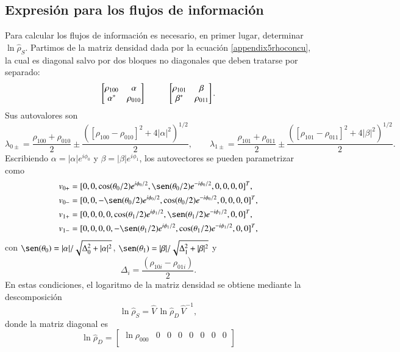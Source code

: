 \begin{appendixs}
\label{appendix5drazin}


\subsection{Expresión para los flujos de información}
Para calcular los flujos de información es necesario, en primer lugar, determinar $\ln \hat{\rho}_{S}$. Partimos de la matriz densidad dada por la ecuación \eqref{appendix5rhoconcu}, la cual es diagonal salvo por dos bloques no diagonales que deben tratarse por separado:
\[
\begin{bmatrix}
    \rho_{100} & \alpha \\
    \alpha^{*} & \rho_{010}
\end{bmatrix}
\hspace{10mm}
\begin{bmatrix}
    \rho_{101} & \beta \\
    \beta^{*} & \rho_{011}
\end{bmatrix}.
\]
Sus autovalores son
\[
\lambda_{0\pm} = \frac{ \rho_{100} +\rho_{010} }{2} \pm \frac{( [\rho_{100} - \rho_{010}]^{2} + 4|\alpha|^{2} )^{1/2} }{ 2 }, 
\qquad
\lambda_{1\pm} = \frac{ \rho_{101} +\rho_{011} }{2} \pm \frac{( [\rho_{101} - \rho_{011}]^{2} + 4|\beta|^{2} )^{1/2} }{ 2 }.
\]
Escribiendo $\alpha = |\alpha|e^{i\phi_{0}}$ y $\beta = |\beta|e^{i\phi_{1}}$, los autovectores se pueden parametrizar como
\begin{align*}
    v_{0+} &  = [0,0,\cos(\theta_{0}/2)e^{i\phi_{0}/2},\sen(\theta_{0}/2)e^{-i\phi_{0}/2},0,0,0,0]^{T}, \\
    v_{0-} &  = [0,0,-\sen(\theta_{0}/2)e^{i\phi_{0}/2},\cos(\theta_{0}/2)e^{-i\phi_{0}/2},0,0,0,0]^{T}, \\
    v_{1+} &  = [0,0,0,0,\cos(\theta_{1}/2)e^{i\phi_{1}/2},\sen(\theta_{1}/2)e^{-i\phi_{1}/2},0,0]^{T}, \\
    v_{1-} &  = [0,0,0,0,-\sen(\theta_{1}/2)e^{i\phi_{1}/2},\cos(\theta_{1}/2)e^{-i\phi_{1}/2},0,0]^{T},
\end{align*}
con $\sen(\theta_{0}) = |\alpha|/\sqrt{\Delta^{2}_{0} + |\alpha|^{2}}$, $\sen(\theta_{1}) = |\beta|/\sqrt{\Delta^{2}_{1} + |\beta|^{2}}$ y
\[
\Delta_{i} = \frac{(\rho_{10i} - \rho_{01i})}{2}.
\]
En estas condiciones, el logaritmo de la matriz densidad se obtiene mediante la descomposición 
\[
\ln \hat{\rho}_{S} = \hat{V}\,\ln \hat{\rho}_{D}\, \hat{V}^{-1},
\]
donde la matriz diagonal es
\[
\ln \hat{\rho}_{D} =
\begin{bmatrix}
    \ln \rho_{000} & 0 & 0 & 0 & 0 & 0 & 0 & 0 \\

\end{bmatrix}\]
\end{appendixs}
